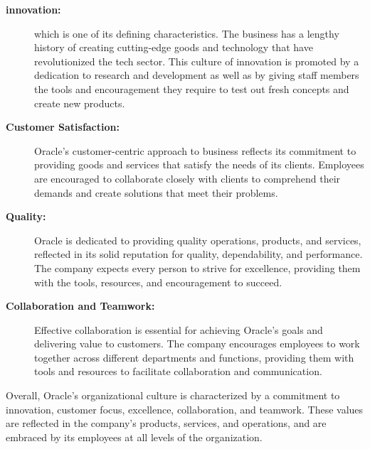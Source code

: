 \begin{description}
    \item[\textbf{innovation:}] which is one of its defining characteristics. The business has a lengthy history of creating cutting-edge goods and technology that have revolutionized the tech sector. This culture of innovation is promoted by a dedication to research and development as well as by giving staff members the tools and encouragement they require to test out fresh concepts and create new products.

    \item[\textbf{Customer Satisfaction:}] Oracle's customer-centric approach to business reflects its commitment to providing goods and services that satisfy the needs of its clients. Employees are encouraged to collaborate closely with clients to comprehend their demands and create solutions that meet their problems.

    \item[\textbf{Quality:}] Oracle is dedicated to providing quality operations, products, and services, reflected in its solid reputation for quality, dependability, and performance. The company expects every person to strive for excellence, providing them with the tools, resources, and encouragement to succeed.

    \item[\textbf{Collaboration and Teamwork:}] Effective collaboration is essential for achieving Oracle's goals and delivering value to customers. The company encourages employees to work together across different departments and functions, providing them with tools and resources to facilitate collaboration and communication.
\end{description}

Overall, Oracle's organizational culture is characterized by a commitment to innovation, customer focus, excellence, collaboration, and teamwork. These values are reflected in the company's products, services, and operations, and are embraced by its employees at all levels of the organization.


